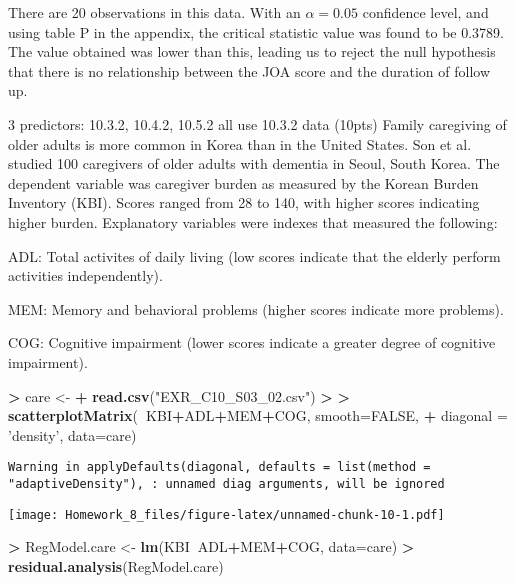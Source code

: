 \documentclass[]{article}
\newenvironment{Shaded}{\begin{snugshade}}{\end{snugshade}}
\newcommand{\KeywordTok}[1]{\textcolor[rgb]{0.13,0.29,0.53}{\textbf{#1}}}
\newcommand{\DataTypeTok}[1]{\textcolor[rgb]{0.13,0.29,0.53}{#1}}
\newcommand{\StringTok}[1]{\textcolor[rgb]{0.31,0.60,0.02}{#1}}
\newcommand{\OtherTok}[1]{\textcolor[rgb]{0.56,0.35,0.01}{#1}}
\newcommand{\OperatorTok}[1]{\textcolor[rgb]{0.81,0.36,0.00}{\textbf{#1}}}
\newcommand{\ErrorTok}[1]{\textcolor[rgb]{0.64,0.00,0.00}{\textbf{#1}}}
\newcommand{\NormalTok}[1]{#1}
\begin{document}
There are 20 observations in this data. With an \(\alpha = 0.05\)
confidence level, and using table P in the appendix, the critical
statistic value was found to be 0.3789. The value obtained was lower
than this, leading us to reject the null hypothesis that there is no
relationship between the JOA score and the duration of follow up.

3 predictors: 10.3.2, 10.4.2, 10.5.2 all use 10.3.2 data (10pts) Family
caregiving of older adults is more common in Korea than in the United
States. Son et al. studied 100 caregivers of older adults with dementia
in Seoul, South Korea. The dependent variable was caregiver burden as
measured by the Korean Burden Inventory (KBI). Scores ranged from 28 to
140, with higher scores indicating higher burden. Explanatory variables
were indexes that measured the following:

ADL: Total activites of daily living (low scores indicate that the
elderly perform activities independently).

MEM: Memory and behavioral problems (higher scores indicate more
problems).

COG: Cognitive impairment (lower scores indicate a greater degree of
cognitive impairment).

\begin{Shaded}
\begin{Highlighting}[]
\OperatorTok{>}\StringTok{ }\NormalTok{care <-}\StringTok{ }
\OperatorTok{+}\StringTok{   }\KeywordTok{read.csv}\NormalTok{(}\StringTok{"EXR_C10_S03_02.csv"}\NormalTok{)}
\OperatorTok{>}\StringTok{ }
\ErrorTok{>}\StringTok{ }\KeywordTok{scatterplotMatrix}\NormalTok{(}\OperatorTok{~}\NormalTok{KBI}\OperatorTok{+}\NormalTok{ADL}\OperatorTok{+}\NormalTok{MEM}\OperatorTok{+}\NormalTok{COG, }\DataTypeTok{smooth=}\OtherTok{FALSE}\NormalTok{, }
\OperatorTok{+}\StringTok{   }\DataTypeTok{diagonal =} \StringTok{'density'}\NormalTok{, }\DataTypeTok{data=}\NormalTok{care)}
\end{Highlighting}
\end{Shaded}

\begin{verbatim}
Warning in applyDefaults(diagonal, defaults = list(method =
"adaptiveDensity"), : unnamed diag arguments, will be ignored
\end{verbatim}

\texttt{[image: Homework\_8\_files/figure-latex/unnamed-chunk-10-1.pdf]}

\begin{Shaded}
\begin{Highlighting}[]
\OperatorTok{>}\StringTok{ }\NormalTok{RegModel.care <-}\StringTok{ }\KeywordTok{lm}\NormalTok{(KBI}\OperatorTok{~}\NormalTok{ADL}\OperatorTok{+}\NormalTok{MEM}\OperatorTok{+}\NormalTok{COG, }\DataTypeTok{data=}\NormalTok{care)}
\OperatorTok{>}\StringTok{ }\KeywordTok{residual.analysis}\NormalTok{(RegModel.care)}
\end{Highlighting}
\end{Shaded}
\end{document}
